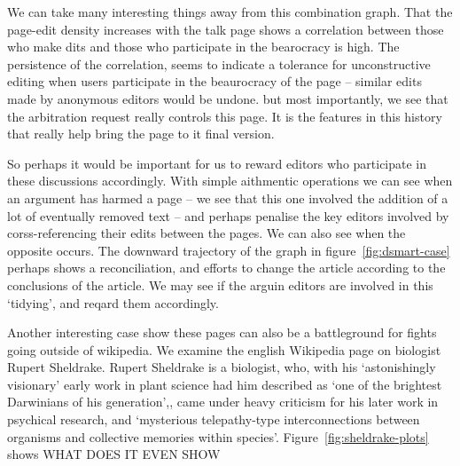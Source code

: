 We can take many interesting things away from this combination
graph. That the page-edit density increases with the talk page shows a
correlation between those who make dits and those who participate in
the bearocracy is high. The persistence of the correlation, seems to
indicate a tolerance for unconstructive editing when users participate
in the beaurocracy of the page -- similar edits made by anonymous
editors would be undone. but most importantly, we see that the
arbitration request really controls this page. It is the features in
this history that really help bring the page to it final version.

So perhaps it would be important for us to reward editors who
participate in these discussions accordingly. With simple aithmentic
operations we can see when an argument has harmed a page -- we see
that this one involved the addition of a lot of eventually removed
text -- and perhaps penalise the key editors involved by
corss-referencing their edits between the pages. We can also see when
the opposite occurs. The downward trajectory of the graph in
figure~\ref{fig:dsmart-case} perhaps shows a reconciliation, and
efforts to change the article according to the conclusions of the
article. We may see if the arguin editors are involved in this
`tidying', and reqard them accordingly.

Another interesting case show these pages can also be a battleground
for fights going outside of wikipedia. We examine the english
Wikipedia page on biologist Rupert Sheldrake. Rupert Sheldrake is a
biologist, who, with his `astonishingly visionary' early work in plant
science had him described as `one of the brightest Darwinians of his
generation',\cite{odyssey-auxin}\cite{guardian-shel}, came under heavy
criticism for his later work in psychical research, and `mysterious
telepathy-type interconnections between organisms and collective
memories within species'.\cite{sheldrake-biog}
Figure~\ref{fig:sheldrake-plots} shows WHAT DOES IT EVEN SHOW

